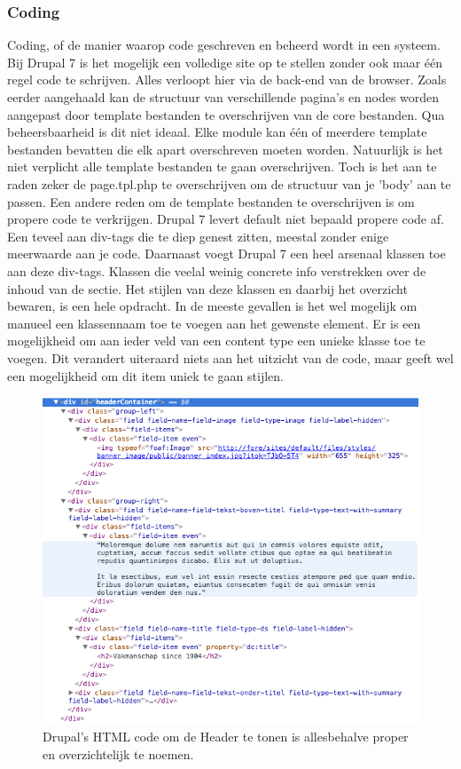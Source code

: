 \subsubsection{Coding}
Coding, of de manier waarop code geschreven en beheerd wordt in een systeem. Bij Drupal 7 is het mogelijk een volledige site op te stellen zonder ook maar één regel code te schrijven. Alles verloopt hier via de back-end van de browser. Zoals eerder aangehaald kan de structuur van verschillende pagina's en nodes worden aangepast door template bestanden te overschrijven van de core bestanden. Qua beheersbaarheid is dit niet ideaal. Elke module kan één of meerdere template bestanden bevatten die elk apart overschreven moeten worden. Natuurlijk is het niet verplicht alle template bestanden te gaan overschrijven. Toch is het aan te raden zeker de page.tpl.php te overschrijven om de structuur van je 'body' aan te passen.
\newline\newline
Een andere reden om de template bestanden te overschrijven is om propere code te verkrijgen. Drupal 7 levert default niet bepaald propere code af. Een teveel aan div-tags die te diep genest zitten, meestal zonder enige meerwaarde aan je code. Daarnaast voegt Drupal 7 een heel arsenaal klassen toe aan deze div-tags. Klassen die veelal weinig concrete info verstrekken over de inhoud van de sectie. Het stijlen van deze klassen en daarbij het overzicht bewaren, is een hele opdracht. In de meeste gevallen is het wel mogelijk om manueel een klassennaam toe te voegen aan het gewenste element. Er is een mogelijkheid om aan ieder veld van een content type een unieke klasse toe te voegen. Dit verandert uiteraard niets aan het uitzicht van de code, maar geeft wel een mogelijkheid om dit item uniek te gaan stijlen. 

\begin{figure}[!ht]
  \includegraphics[width=\textwidth]{img/dr-htmldiv.png}
  \caption{Drupal's HTML code om de Header te tonen is allesbehalve proper en overzichtelijk te noemen.}
  \label{fig:Drupal html structuur.}
\end{figure}

